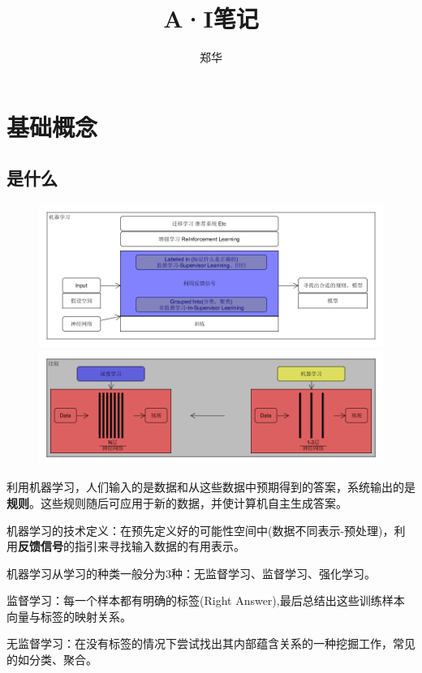 \documentclass[UTF8,a4paper,12pt]{ctexbook}
\author{\kaishu 郑华}
\title{\heiti A·I笔记}
\begin{document}
 	\maketitle

\chapter{基础概念}
	\section{是什么}
		\begin{figure}[H]
			\centering
			\includegraphics[width=\linewidth]{Basic_001}
			\includegraphics[width=\linewidth]{Basic_002}
		\end{figure}
		
		利用机器学习，人们输入的是数据和从这些数据中预期得到的答案，系统输出的是\textbf{规则}。这些规则随后可应用于新的数据，并使计算机自主生成答案。
		
		机器学习的技术定义：在预先定义好的可能性空间中(数据不同表示-预处理)，利用\textbf{反馈信号}的指引来寻找输入数据的有用表示。
		
		机器学习从学习的种类一般分为3种：无监督学习、监督学习、强化学习。
		
		监督学习：每一个样本都有明确的标签(Right Answer),最后总结出这些训练样本向量与标签的映射关系。
		
		无监督学习：在没有标签的情况下尝试找出其内部蕴含关系的一种挖掘工作，常见的如分类、聚合。
		
\end{document}
